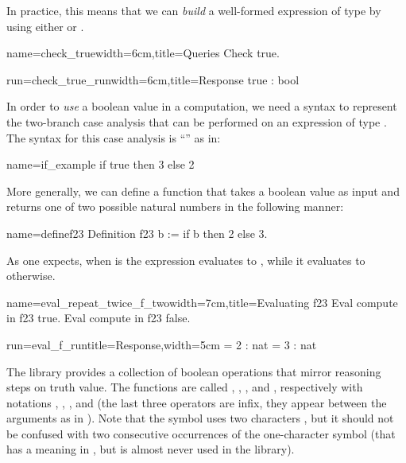 
In practice, this means that we can \emph{build} a well-formed expression of
type  by using either  or .

\begin{coq}{name=check_true}{width=6cm,title=Queries}
Check true.
\end{coq}
\begin{coqout}{run=check_true_run}{width=6cm,title=Response}
true : bool
\end{coqout}

In order to \emph{use} a boolean value in a computation, we need a
syntax to represent the two-branch case analysis that can be performed
on an expression of type . The \Coq{} syntax for this case analysis is
``'' as in:

\begin{coq}{name=if_example}{}
if true then 3 else 2
\end{coq}
More generally, we can define a function that takes a boolean value as
input and returns one of two possible natural numbers in the following
manner:

\begin{coq}{name=definef23}{}
Definition f23 b := if b then 2 else 3.
\end{coq}

As one expects, when  is  the expression
 evaluates to , while it evaluates to  otherwise.

\begin{coq}{name=eval_repeat_twice_f_two}{width=7cm,title=Evaluating f23}
Eval compute in f23 true.
Eval compute in f23 false.
\end{coq}
\begin{coqout}{run=eval_f_run}{title=Response,width=5cm}
  = 2 : nat
  = 3 : nat
\end{coqout}

The \mcbMC{} library provides a collection of boolean operations that
mirror reasoning steps on truth value.  The functions are called
, ,  , and , respectively with notations
\C{\~\~},  \C{||}, \C{&&}, and \C{==>} (the last three operators are
infix, they appear between the arguments as in ).
  Note that the symbol \C{\~\~} uses two characters \C{\~}, but it should
not be confused with two consecutive occurrences of the one-character symbol
\C{\~} (that has a meaning in \Coq{}, but is almost never used
in the \mcbMC{} library).

